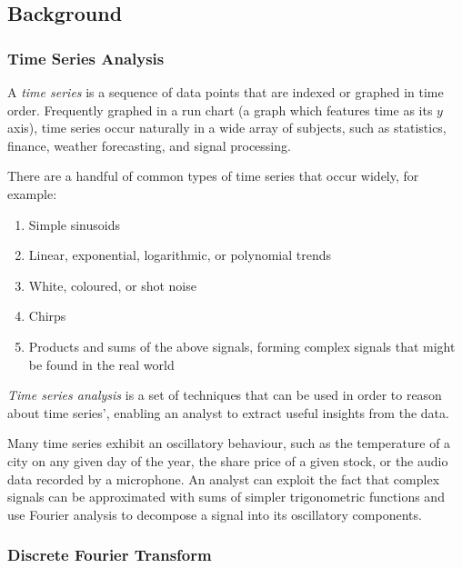 \documentclass[
  english,
  paper=a4,
  oneside  ,captions=tableheading
]{scrbook}
\begin{document}
\hypertarget{background}{%
\subsection{Background}\label{background}}

\hypertarget{time-series-analysis}{%
\subsubsection{Time Series Analysis}\label{time-series-analysis}}

A \emph{time series} is a sequence of data points that are indexed or
graphed in time order. Frequently graphed in a run chart (a graph which
features time as its \(y\) axis), time series occur naturally in a
wide array of subjects, such as statistics, finance, weather
forecasting, and signal processing.

There are a handful of common types of time series that occur widely,
for example: 

\begin{enumerate}
	\item Simple sinusoids 
	\item Linear, exponential, logarithmic, or polynomial trends 
	\item White, coloured, or shot noise 
	\item Chirps 
	\item Products and sums of the above signals, forming complex signals that might be found in the real world
\end{enumerate}

\emph{Time series analysis} is a set of techniques that can be used in
order to reason about time series', enabling an analyst to extract
useful insights from the data.

Many time series exhibit an oscillatory behaviour, such as the
temperature of a city on any given day of the year, the share price of a
given stock, or the audio data recorded by a microphone. An analyst can
exploit the fact that complex signals can be approximated with sums of
simpler trigonometric functions and use Fourier analysis to decompose a
signal into its oscillatory components.

\hypertarget{discrete-fourier-transform}{%
\subsubsection{Discrete Fourier
Transform}\label{discrete-fourier-transform}}
\end{document}
